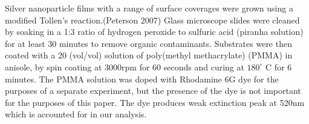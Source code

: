 Silver nanoparticle films with a range of surface coverages were grown using a modified Tollen’s reaction.(Peterson 2007) Glass microscope slides were cleaned by soaking in a 1:3 ratio of hydrogen peroxide to sulfuric acid (piranha solution) for at least 30 minutes to remove organic contaminants. Substrates were then coated with a 20 (vol/vol) solution of poly(methyl methacrylate) (PMMA) in anisole, by spin coating at 3000rpm for 60 seconds and curing at $180^\circ$ C for 6 minutes. The PMMA solution was doped with Rhodamine 6G dye for the purposes of a separate experiment, but the presence of the dye is not important for the purposes of this paper. The dye produces weak extinction peak at 520nm which is accounted for in our analysis.